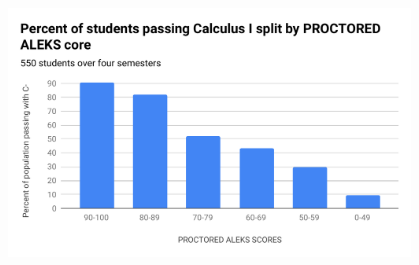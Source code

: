 \documentclass[12pt]{article}
\begin{document}
\newpage

\begin{figure}
\begin{center}
\includegraphics[width=0.95\textwidth]{ALEKS-vs-success-bar}
\end{center}
\end{figure}
\end{document}
